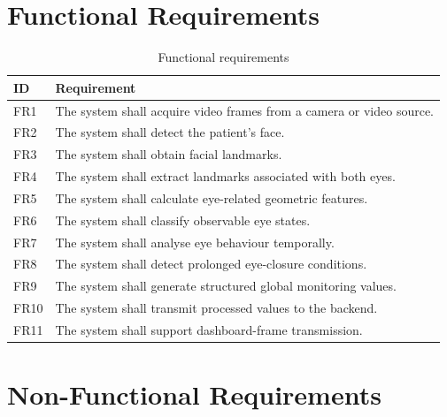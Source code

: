 \documentclass{tietreport}
\begin{document}

\section{Functional Requirements}

\begin{table}[H]
\centering
\caption{Functional requirements}
\label{tab:functional}

\begin{tabularx}{0.95\textwidth}{@{}P{2cm}Y@{}}

\toprule
\textbf{ID} & \textbf{Requirement}\\
\midrule

FR1 & The system shall acquire video frames from a camera or video
source.\\
FR2 & The system shall detect the patient's face.\\
FR3 & The system shall obtain facial landmarks.\\
FR4 & The system shall extract landmarks associated with both eyes.\\
FR5 & The system shall calculate eye-related geometric features.\\
FR6 & The system shall classify observable eye states.\\
FR7 & The system shall analyse eye behaviour temporally.\\
FR8 & The system shall detect prolonged eye-closure conditions.\\
FR9 & The system shall generate structured global monitoring values.\\
FR10 & The system shall transmit processed values to the backend.\\
FR11 & The system shall support dashboard-frame transmission.\\

\bottomrule

\end{tabularx}
\end{table}


\section{Non-Functional Requirements}
\end{document}
